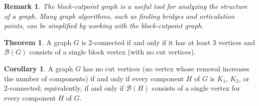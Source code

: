 \documentclass{article}
\newtheorem{remark}{Remark}
\theoremstyle{definition}
\newtheorem{theorem}{Theorem}
\newtheorem{corollary}{Corollary}
\begin{document}
\begin{remark}
The block-cutpoint graph is a useful tool for analyzing the structure of a graph. Many graph algorithms, such as finding bridges and articulation points, can be simplified by working with the block-cutpoint graph.
\end{remark}

\begin{theorem}
A graph $G$ is 2-connected if and only if it has at least 3 vertices and $\mathcal{B}(G)$ consists of a single block vertex (with no cut vertices).
\end{theorem}

\begin{corollary}
A graph $G$ has no cut vertices (no vertex whose removal increases the number of components) if and only if every component $H$ of $G$ is $K_1$, $K_2$, or 2-connected; equivalently, if and only if $\mathcal{B}(H)$ consists of a single vertex for every component $H$ of $G$.
\end{corollary}

\begin{center}
\noindent\begin{minipage}{\linewidth}\centering
{}
\label{fig:block-cutpoint-graph}
\end{minipage}
\end{center}
\end{document}
